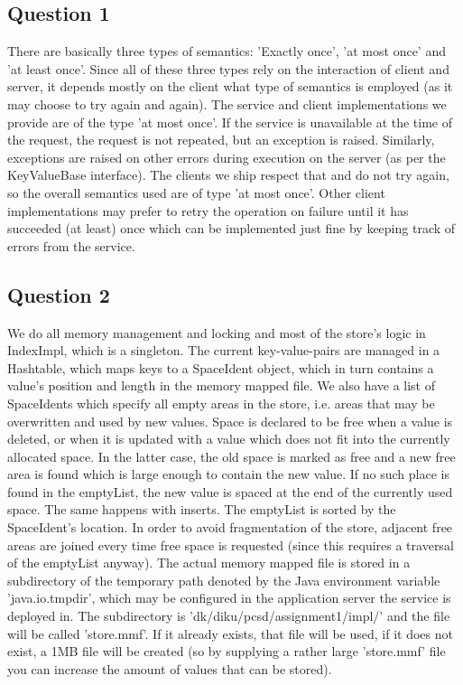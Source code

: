 \documentclass[12pt,a4paper]{article}
\newcommand{\code}[1]{{\fontfamily{fvm}\small \selectfont #1}}
\begin{document}
\subsection*{Question 1}
\label{sec:pq1}
There are basically three types of semantics: 'Exactly once', 'at most once' and 'at least once'. Since all of these three types rely on the interaction of client and server, it depends mostly on the client what type of semantics is employed (as it may choose to try again and again). The service and client implementations we provide are of the type 'at most once'. If the service is unavailable at the time of the request, the request is not repeated, but an exception is raised. Similarly, exceptions are raised on other errors during execution on the server (as per the \code{KeyValueBase} interface). The clients we ship respect that and do not try again, so the overall semantics used are of type 'at most once'. Other client implementations may prefer to retry the operation on failure until it has succeeded (at least) once which can be implemented just fine by keeping track of errors from the service.

\subsection*{Question 2}
\label{sec:pq2}

We do all memory management and locking and most of the store's logic in IndexImpl, which is a singleton. The current key-value-pairs are managed in a Hashtable, which maps keys to a SpaceIdent object, which in turn contains a value's position and length in the memory mapped file. We also have a list of SpaceIdents which specify all empty areas in the store, i.e. areas that may be overwritten and used by new values. Space is declared to be free when a value is deleted, or when it is updated with a value which does not fit into the currently allocated space. In the latter case, the old space is marked as free and a new free area is found which is large enough to contain the new value. If no such place is found in the emptyList, the new value is spaced at the end of the currently used space. The same happens with inserts. The emptyList is sorted by the SpaceIdent's location. In order to avoid fragmentation of the store, adjacent free areas are joined every time free space is requested (since this requires a traversal of the emptyList anyway). The actual memory mapped file is stored in a subdirectory of the temporary path denoted by the Java environment variable 'java.io.tmpdir', which may be configured in the application server the service is deployed in. The subdirectory is 'dk/diku/pcsd/assignment1/impl/' and the file will be called 'store.mmf'. If it already exists, that file will be used, if it does not exist, a 1MB file will be created (so by supplying a rather large 'store.mmf' file you can increase the amount of values that can be stored).
\end{document}
